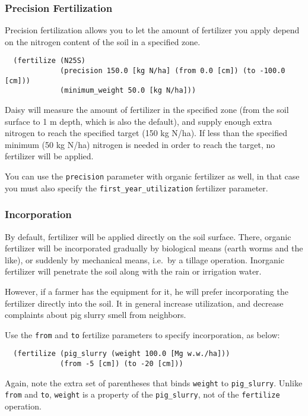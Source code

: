 \documentclass[a4paper]{article}
\begin{document}
\subsubsection{Precision Fertilization}

Precision fertilization allows you to let the amount of fertilizer you
apply depend on the nitrogen content of the soil in a specified zone.

\begin{verbatim}
  (fertilize (N25S)
             (precision 150.0 [kg N/ha] (from 0.0 [cm]) (to -100.0 [cm]))
             (minimum_weight 50.0 [kg N/ha]))
\end{verbatim}

Daisy will measure the amount of fertilizer in the specified zone (from
the soil surface to 1 m depth, which is also the default), and supply
enough extra nitrogen to reach the specified target (150 kg N/ha).  If
less than the specified minimum (50 kg N/ha) nitrogen is needed in
order to reach the target, no fertilizer will be applied.

You can use the \texttt{precision} parameter with organic fertilizer
as well, in that case you must also specify the
\texttt{first\_year\_utilization} fertilizer parameter.


\subsubsection{Incorporation}

By default, fertilizer will be applied directly on the soil surface.
There, organic fertilizer will be incorporated gradually by biological
means (earth worms and the like), or suddenly by mechanical means,
i.e.\ by a tillage operation.  Inorganic fertilizer will penetrate the
soil along with the rain or irrigation water.

However, if a farmer has the equipment for it, he will prefer
incorporating the fertilizer directly into the soil.  It in general
increase utilization, and decrease complaints about pig slurry smell
from neighbors.

Use the \texttt{from} and \texttt{to} fertilize parameters to specify
incorporation, as below:
\begin{verbatim}
  (fertilize (pig_slurry (weight 100.0 [Mg w.w./ha]))
             (from -5 [cm]) (to -20 [cm]))
\end{verbatim}
Again, note the extra set of parentheses that binds \texttt{weight} to
\texttt{pig\_slurry}.  Unlike \texttt{from} and \texttt{to},
\texttt{weight} is a property of the \texttt{pig\_slurry}, not of the
\texttt{fertilize} operation.
\end{document}
